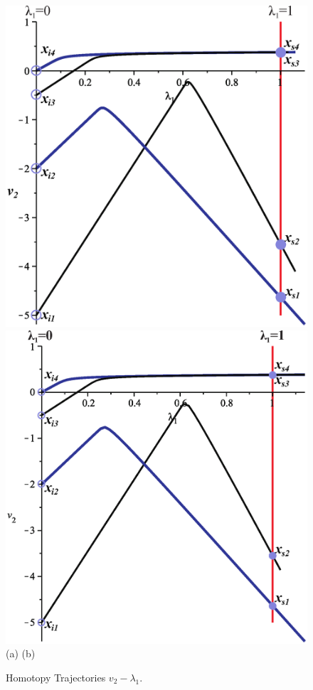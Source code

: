\documentclass[conference,letterpaper,twocolumn]{IEEEtran}
\begin{document}
\begin{figure}[hbtp]
\centering
\includegraphics[scale=0.17]{fig/curvasesfera.eps}
\includegraphics[scale=0.17]{fig/curvascirculo.eps} \\
(a)              \hspace{2cm}          (b)
\caption{Homotopy Trajectories $v_2-\lambda_1$.}
\label{ht1}
\end{figure}
\end{document}
